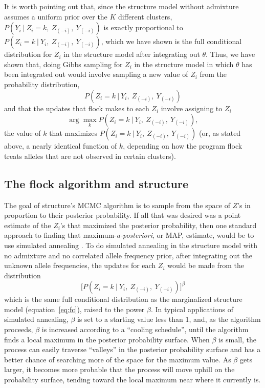 It is worth pointing out that, since the
{\sc structure} model without admixture assumes a uniform prior over 
the $K$ different clusters, $P(Y_{i}~|~Z_i=k,~Z_{(-i)},~Y_{(-i)})$
is exactly proportional to $P(Z_i=k~|~Y_i, ~Z_{(-i)},~Y_{(-i)})$, which 
we have shown is the
full conditional distribution for $Z_i$ in the {\sc structure} model after
integrating out $\theta$.  Thus, we have shown that, doing Gibbs
sampling for $Z_i$ in  the {\sc structure} model in which $\theta$ has been
integrated out would involve sampling a new value of $Z_i$ from the 
probability distribution,
\[
P(Z_i=k~|~Y_i, ~Z_{(-i)},~Y_{(-i)})
\]
and that the updates that
{\sc flock} makes to each $Z_i$ involve assigning to $Z_i$
\begin{equation}
\arg\max_k P(Z_i=k~|~Y_i, ~Z_{(-i)},~Y_{(-i)}),
\end{equation}
\ie the value of $k$ that maximizes $P(Z_i=k~|~Y_i, ~Z_{(-i)},~Y_{(-i)})$
(or, as stated above, a nearly identical function of $k$, depending on how
the program {\sc flock} treats alleles that are not observed in certain clusters).

\subsection*{The {\sc flock} algorithm and {\sc structure}}
The goal of {\sc structure}'s MCMC algorithm is to sample from the space of 
$Z$'s in proportion to their posterior probability.  If all that was desired
was a point estimate of the $Z_i$'s that maximized the posterior probability,
then one standard approach to finding that maximum-{\em a-posteriori}, or MAP, 
estimate, would be to use simulated annealing \citep{Kirkpatricketal1983}.
To do simulated annealing in the {\sc structure} model with no admixture and
no correlated allele frequency prior, after integrating out the unknown
allele frequencies, the updates for each $Z_i$ would be made from the 
distribution
\[
\biggl[P(Z_i=k~|~Y_i, ~Z_{(-i)},~Y_{(-i)})\biggr]^\beta
\]
which is the same full conditional distribution as the marginalized {\sc structure}
model (equation~\ref{eq:fc}), raised
to the power $\beta$.  In typical applications of simulated annealing,
$\beta$ is set to a starting value less than 1, and, as the algorithm proceeds,
$\beta$ is increased according to a ``cooling schedule''\citep{Hajek1988}, until
the algorithm finds a local maximum in the posterior probability surface.  
When $\beta$ is small, the process can easily traverse ``valleys''
in the posterior probability surface and has a better chance of searching
more of the space for the maximum value.  As $\beta$ gets larger, it becomes
more probable that the process will
move uphill on the probability surface, tending toward the local
maximum near where it currently is.    

